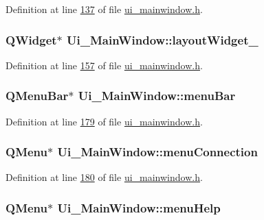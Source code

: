 Definition at line \hyperlink{a00139_source_l00137}{137} of file \hyperlink{a00139_source}{ui\+\_\+mainwindow.\+h}.

\hypertarget{a00080_a11b1a1b252036633f800cedbf396286b}{
\subsubsection[{layout\+Widget\+\_\+5}]{\setlength{\rightskip}{0pt plus 5cm}Q\+Widget$\ast$ Ui\+\_\+\+Main\+Window\+::layout\+Widget\+\_}}\label{a00080_a11b1a1b252036633f800cedbf396286b}


Definition at line \hyperlink{a00139_source_l00157}{157} of file \hyperlink{a00139_source}{ui\+\_\+mainwindow.\+h}.

\hypertarget{a00080_a2be1c24ec9adfca18e1dcc951931457f}{
\subsubsection[{menu\+Bar}]{\setlength{\rightskip}{0pt plus 5cm}Q\+Menu\+Bar$\ast$ Ui\+\_\+\+Main\+Window\+::menu\+Bar}}\label{a00080_a2be1c24ec9adfca18e1dcc951931457f}


Definition at line \hyperlink{a00139_source_l00179}{179} of file \hyperlink{a00139_source}{ui\+\_\+mainwindow.\+h}.

\hypertarget{a00080_a08372e1c0820afb98e2cdf98d1738036}{
\subsubsection[{menu\+Connection}]{\setlength{\rightskip}{0pt plus 5cm}Q\+Menu$\ast$ Ui\+\_\+\+Main\+Window\+::menu\+Connection}}\label{a00080_a08372e1c0820afb98e2cdf98d1738036}


Definition at line \hyperlink{a00139_source_l00180}{180} of file \hyperlink{a00139_source}{ui\+\_\+mainwindow.\+h}.

\hypertarget{a00080_ab95dbfbb0550206aeac76db36f491548}{
\subsubsection[{menu\+Help}]{\setlength{\rightskip}{0pt plus 5cm}Q\+Menu$\ast$ Ui\+\_\+\+Main\+Window\+::menu\+Help}}\label{a00080_ab95dbfbb0550206aeac76db36f491548}


